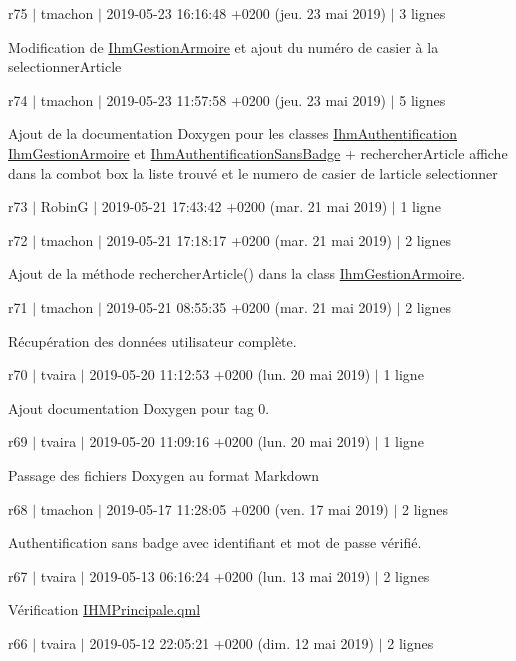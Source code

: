 r75 $\vert$ tmachon $\vert$ 2019-\/05-\/23 16\+:16\+:48 +0200 (jeu. 23 mai 2019) $\vert$ 3 lignes

Modification de \hyperlink{class_ihm_gestion_armoire}{Ihm\+Gestion\+Armoire} et ajout du numéro de casier à la selectionner\+Article

r74 $\vert$ tmachon $\vert$ 2019-\/05-\/23 11\+:57\+:58 +0200 (jeu. 23 mai 2019) $\vert$ 5 lignes

Ajout de la documentation Doxygen pour les classes \hyperlink{class_ihm_authentification}{Ihm\+Authentification} \hyperlink{class_ihm_gestion_armoire}{Ihm\+Gestion\+Armoire} et \hyperlink{class_ihm_authentification_sans_badge}{Ihm\+Authentification\+Sans\+Badge} + rechercher\+Article affiche dans la combot box la liste trouvé et le numero de casier de l\textquotesingle{}article selectionner

r73 $\vert$ RobinG $\vert$ 2019-\/05-\/21 17\+:43\+:42 +0200 (mar. 21 mai 2019) $\vert$ 1 ligne

r72 $\vert$ tmachon $\vert$ 2019-\/05-\/21 17\+:18\+:17 +0200 (mar. 21 mai 2019) $\vert$ 2 lignes

Ajout de la méthode rechercher\+Article() dans la class \hyperlink{class_ihm_gestion_armoire}{Ihm\+Gestion\+Armoire}.

r71 $\vert$ tmachon $\vert$ 2019-\/05-\/21 08\+:55\+:35 +0200 (mar. 21 mai 2019) $\vert$ 2 lignes

Récupération des données utilisateur complète.

r70 $\vert$ tvaira $\vert$ 2019-\/05-\/20 11\+:12\+:53 +0200 (lun. 20 mai 2019) $\vert$ 1 ligne

Ajout documentation Doxygen pour tag 0.

r69 $\vert$ tvaira $\vert$ 2019-\/05-\/20 11\+:09\+:16 +0200 (lun. 20 mai 2019) $\vert$ 1 ligne

Passage des fichiers Doxygen au format Markdown

r68 $\vert$ tmachon $\vert$ 2019-\/05-\/17 11\+:28\+:05 +0200 (ven. 17 mai 2019) $\vert$ 2 lignes

Authentification sans badge avec identifiant et mot de passe vérifié.

r67 $\vert$ tvaira $\vert$ 2019-\/05-\/13 06\+:16\+:24 +0200 (lun. 13 mai 2019) $\vert$ 2 lignes

Vérification \hyperlink{_i_h_m_principale_8qml}{I\+H\+M\+Principale.\+qml}

r66 $\vert$ tvaira $\vert$ 2019-\/05-\/12 22\+:05\+:21 +0200 (dim. 12 mai 2019) $\vert$ 2 lignes

